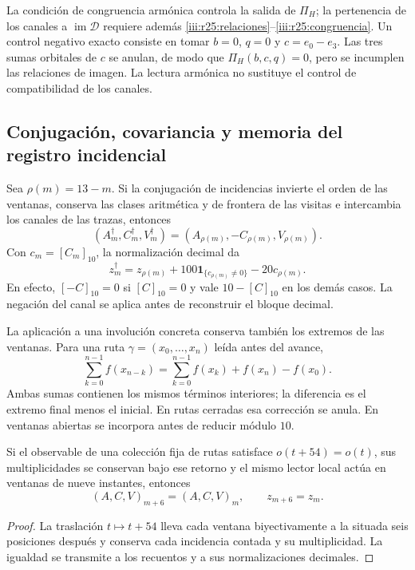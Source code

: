 La condición de congruencia armónica controla la salida de $\Pi_H$;
la pertenencia de los canales a $\operatorname{im}\mathcal D$
requiere además \eqref{iii:r25:relaciones}--\eqref{iii:r25:congruencia}.
Un control negativo exacto consiste en tomar $b=0$, $q=0$ y
$c=e_0-e_3$. Las tres sumas orbitales de $c$ se anulan, de modo
que $\Pi_H(b,c,q)=0$, pero se incumplen las relaciones de imagen.
La lectura armónica no sustituye el control de compatibilidad de
los canales.

\subsection{Conjugación, covariancia y memoria del registro incidencial}
\label{iii:r25:transporte}

Sea $\rho(m)=13-m$. Si la conjugación de incidencias invierte el
orden de las ventanas, conserva las clases aritmética y de frontera
de las visitas e intercambia los canales de las trazas, entonces
\[
 (A_m^\dagger,C_m^\dagger,V_m^\dagger)
 =(A_{\rho(m)},-C_{\rho(m)},V_{\rho(m)}).
\]
Con $c_m=[C_m]_{10}$, la normalización decimal da
\begin{equation}
 z_m^\dagger=z_{\rho(m)}
 +100\mathbf1_{\{c_{\rho(m)}\ne0\}}-20c_{\rho(m)}.
 \label{iii:r25:conjugacion}
\end{equation}
En efecto, $[-C]_{10}=0$ si $[C]_{10}=0$ y vale
$10-[C]_{10}$ en los demás casos. La negación del canal se
aplica antes de reconstruir el bloque decimal.

La aplicación a una involución concreta conserva también los
extremos de las ventanas. Para una ruta
$\gamma=(x_0,\ldots,x_n)$ leída antes del avance,
\begin{equation}
 \sum_{k=0}^{n-1}f(x_{n-k})
 =\sum_{k=0}^{n-1}f(x_k)+f(x_n)-f(x_0).
 \label{iii:r25:extremos}
\end{equation}
Ambas sumas contienen los mismos términos interiores; la diferencia
es el extremo final menos el inicial. En rutas cerradas esa
corrección se anula. En ventanas abiertas se incorpora antes de
reducir módulo $10$.

\begin{proposition}
\label{iii:r25:periodo}
Si el observable de una colección fija de rutas satisface
$o(t+54)=o(t)$, sus multiplicidades se conservan bajo ese retorno
y el mismo lector local actúa en ventanas de nueve instantes,
entonces
\[
 (A,C,V)_{m+6}=(A,C,V)_m,\qquad z_{m+6}=z_m.
\]
\end{proposition}
\begin{proof}
La traslación $t\mapsto t+54$ lleva cada ventana biyectivamente
a la situada seis posiciones después y conserva cada incidencia
contada y su multiplicidad. La igualdad se transmite a los recuentos
y a sus normalizaciones decimales.
\end{proof}

